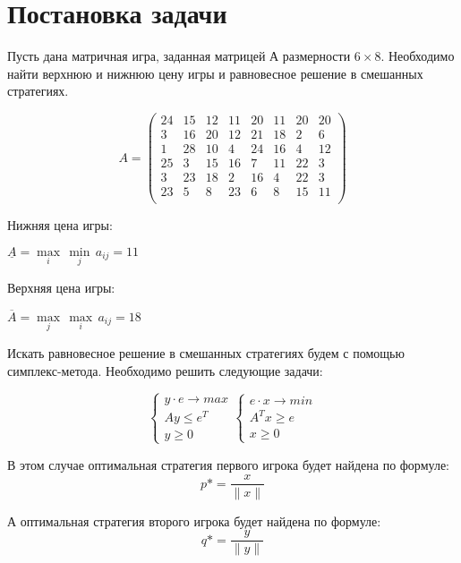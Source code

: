 \documentclass[a4paper, 14pt]{extarticle}
\newenvironment{widerequation}{%
	\begin{adjustwidth}{-2cm}{-2cm}\[}
		{\]\end{adjustwidth}}
\begin{document}
	\pagebreak	
	
	\section{Постановка задачи}
		Пусть дана матричная игра, заданная матрицей А размерности $6 \times 8$. Необходимо найти верхнюю и нижнюю цену игры и равновесное решение в смешанных стратегиях.
		
		\begin{widerequation}
			A = \begin{pmatrix}
					24 & 15 & 12 & 11 & 20  & 11 & 20 & 20\\
					3  & 16 & 20  & 12  & 21 & 18 & 2 & 6\\
					1 & 28 & 10  & 4 & 24 & 16 & 4 & 12\\
					25 & 3 & 15  & 16 & 7  & 11 & 22 & 3\\
					3 & 23 & 18 & 2  & 16 & 4 & 22 & 3\\
					23  & 5 & 8 & 23 & 6 & 8 & 15 & 11\\
				\end{pmatrix}
		\end{widerequation}
	
		Нижняя цена игры:
		
		$\underline{A} = \underset{i}{\max} \, \underset{j}{\min} \, a_{ij} = 11$
		
		Верхняя цена игры:
		
		$\overline{A} = \underset{j}{\max} \, \underset{i}{\max} \, a_{ij} = 18$
	
		Искать равновесное решение в смешанных стратегиях будем с помощью симплекс-метода. Необходимо решить следующие задачи:
		
		\[ 
			\begin{cases}
				y \cdot e \rightarrow max\\
				Ay \leq e^T\\
				y \geq 0
			\end{cases}
			\begin{cases}
				e \cdot x \rightarrow min\\
				A^Tx \geq e\\
				x \geq 0
			\end{cases}
		\]
		
		В этом случае оптимальная стратегия первого игрока будет найдена по формуле:
		\[ p* = \dfrac{x}{\|x\|} \]
		
		А оптимальная стратегия второго игрока будет найдена по формуле:
		\[ q* = \dfrac{y}{\|y\|} \]
		
\end{document}
